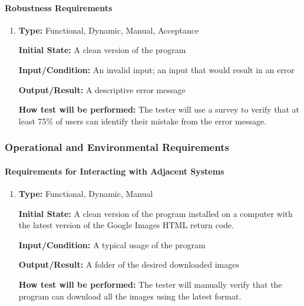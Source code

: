 \documentclass[12pt, titlepage]{article}
\begin{document}
\paragraph{Robustness Requirements}

\begin{enumerate}[label=NFR-RR\arabic*:, wide=0pt, leftmargin=*]

\item \phantom{empty}

\textbf{Type:} Functional, Dynamic, Manual, Acceptance
					
\textbf{Initial State:} A clean version of the program
					
\textbf{Input/Condition:} An invalid input; an input that would result in an error
					
\textbf{Output/Result:} A descriptive error message
					
\textbf{How test will be performed:} The tester will use a survey to verify that at least 75\% of users can identify their mistake from the error message.

\end{enumerate}

\subsubsection{Operational and Environmental Requirements}
		
\paragraph{Requirements for Interacting with Adjacent Systems}

\begin{enumerate}[label=NFR-IAR\arabic*:, wide=0pt, leftmargin=*]

\item \phantom{empty}

\textbf{Type:} Functional, Dynamic, Manual
					
\textbf{Initial State:} A clean version of the program installed on a computer with the latest version of the Google Images HTML return code.
					
\textbf{Input/Condition:} A typical usage of the program
					
\textbf{Output/Result:} A folder of the desired downloaded images
					
\textbf{How test will be performed:} The tester will manually verify that the program can download all the images using the latest format.

\end{enumerate}
\end{document}
